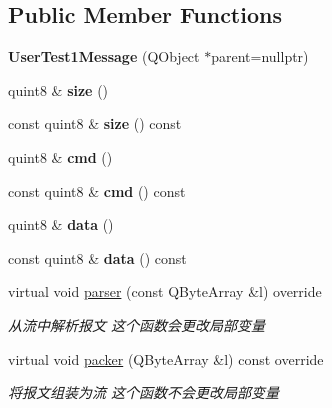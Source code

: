 \subsection*{Public Member Functions}
\begin{DoxyCompactItemize}
\item 
\mbox{\label{class_user_test1_message_a5bb5a9255bfa29e5a64b86c057681505}} 
{\bfseries User\+Test1\+Message} (Q\+Object $\ast$parent=nullptr)
\item 
\mbox{\label{class_user_test1_message_a34a4c753999254f6bbb6b4d59fe69376}} 
quint8 \& {\bfseries size} ()
\item 
\mbox{\label{class_user_test1_message_a03366f9788ba9cd00a89a7174d6300fd}} 
const quint8 \& {\bfseries size} () const
\item 
\mbox{\label{class_user_test1_message_aaeda71b63c0e7156d9d6e271d68f31bd}} 
quint8 \& {\bfseries cmd} ()
\item 
\mbox{\label{class_user_test1_message_af5e77ee82613d0b39787e3a8a0effe3f}} 
const quint8 \& {\bfseries cmd} () const
\item 
\mbox{\label{class_user_test1_message_a4984c6f36a1437751d18bcda8eba29b8}} 
quint8 \& {\bfseries data} ()
\item 
\mbox{\label{class_user_test1_message_a9f519357284523f848c665bb7691b279}} 
const quint8 \& {\bfseries data} () const
\item 
virtual void \mbox{\hyperlink{class_user_test1_message_a8e78ea5b1ce4acf940b796018cd22008}{parser}} (const Q\+Byte\+Array \&l) override
\begin{DoxyCompactList}\small\item\em 从流中解析报文 这个函数会更改局部变量 \end{DoxyCompactList}\item 
virtual void \mbox{\hyperlink{class_user_test1_message_aa91a6b74efd42183cbb1a909fdc2b86c}{packer}} (Q\+Byte\+Array \&l) const override
\begin{DoxyCompactList}\small\item\em 将报文组装为流 这个函数不会更改局部变量 \end{DoxyCompactList}\end{DoxyCompactItemize}


